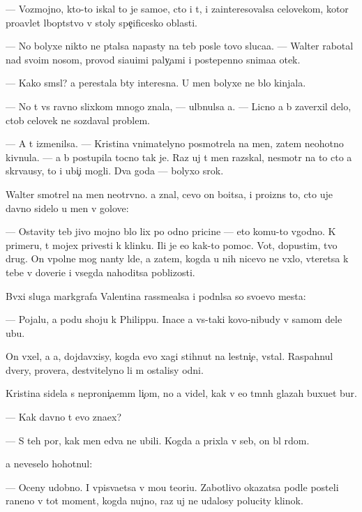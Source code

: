 \documentclass[10pt]{book}
\begin{document}
— Vozmojno, kto-to iskal to je samo{\y}e, cto i t{\yi}, i zainteresovalsa celovekom, kotor{\yi}{\y} pro{\y}avl{\ia}{\y}et l{\iu}bop{\yi}tstvo v stoly spe{\c}ificesko{\y} oblasti.

— No bolyxe nikto ne p{\yi}talsa napasty na teb{\ia} posle tovo sluca{\y}a. — Walter rabotal nad svo{\y}im nosom, provod{\ia} si{\y}a{\y}u{\x}imi paly{\c}ami i postepenno snima{\y}a otek.

— Kako{\y} sm{\yi}sl? {\Y}a perestala b{\yi}ty interesna. U men{\ia} bolyxe ne b{\yi}lo kinjala.

— No t{\yi} vs{\e} ravno slixkom mnogo znala, — ul{\yi}bnulsa {\y}a. — Licno {\y}a b{\yi} zaverxil delo, ctob{\yi} celovek ne sozdaval problem{\yi}.

— A t{\yi} izmenilsa. — Kristina vnimatelyno posmotrela na men{\ia}, zatem neohotno kivnula. — {\Y}a b{\yi} postupila tocno tak je. Raz uj t{\yi} men{\ia} raz{\yi}skal, nesmotr{\ia} na to cto {\y}a skr{\yi}va{\y}usy, to i ubi{\y}{\c}i mogli. Dva goda — bolyxo{\y} srok.

Walter smotrel na men{\ia} neotr{\yi}vno. {\Y}a znal, cevo on bo{\y}itsa, i proizn{\e}s to, cto uje davno sidelo u men{\ia} v golove:

— Ostavity teb{\ia} jivo{\y} mojno b{\yi}lo lix po odno{\y} pricine — eto komu-to v{\yi}godno. K primeru, t{\yi} mojex privesti k klinku. Ili je {\y}e{\x}o kak-to pomoc. Vot, dopustim, tvo{\y} drug. On vpolne mog nan{\ia}ty l{\iu}de{\y}, a zatem, kogda u nih nicevo ne v{\yi}xlo, vteretsa k tebe v doveri{\y}e i vsegda nahoditsa poblizosti.

B{\yi}vxi{\y} sluga markgrafa Valentina rassme{\y}alsa i podn{\ia}lsa so svo{\y}evo mesta:

— Pojalu{\y}, {\y}a po{\y}du shoju k Philippu. Inace {\y}a vs{\e}-taki kovo-nibudy v samom dele ub{\y}u.

On v{\yi}xel, a {\y}a, dojdavxisy, kogda {\y}evo xagi stihnut na lestni{\c}e, vstal. Raspahnul dvery, prover{\ia}{\y}a, de{\y}stvitelyno li m{\yi} ostalisy odni.

Kristina sidela s neproni{\c}a{\y}em{\yi}m li{\c}om, no {\y}a videl, kak v {\y}e{\y}o t{\e}mn{\yi}h glazah buxu{\y}et bur{\ia}.

— Kak davno t{\yi} {\y}evo zna{\y}ex?

— S teh por, kak men{\ia} {\y}edva ne ubili. Kogda {\y}a prixla v seb{\ia}, on b{\yi}l r{\ia}dom.

{\Y}a neveselo hohotnul:

— Oceny udobno. I vpis{\yi}va{\y}etsa v mo{\y}u teori{\y}u. Zabotlivo okazatsa podle posteli raneno{\y} v tot moment, kogda nujno, raz uj ne udalosy polucity klinok.
\end{document}

